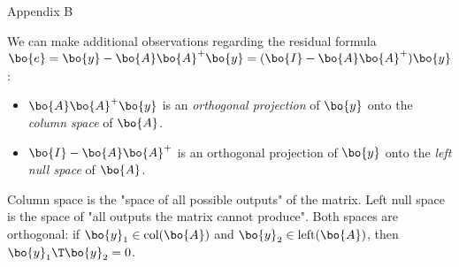 \documentclass{beamer}
\begin{document}
\begin{frame}{Appendix B}
	\begin{flushleft}
		
		We can make additional observations regarding the residual formula $\bo{e} = \bo{y} - \bo{A}\bo{A}^+\bo{y} = (\bo{I} - \bo{A}\bo{A}^+)\bo{y} $:
		
		\begin{itemize}
			
			\item $\bo{A}\bo{A}^+\bo{y}$ is an \emph{orthogonal projection} of $\bo{y}$ onto the \emph{column space} of $\bo{A}$.
			
			\item $\bo{I} - \bo{A}\bo{A}^+$ is an orthogonal projection of $\bo{y}$ onto the \emph{left null space} of $\bo{A}$.
		\end{itemize}
		
		Column space is the "space of all possible outputs" of the matrix. Left null space is the space of "all outputs the matrix cannot produce". Both spaces are orthogonal: if $\bo{y}_1 \in \text{col}(\bo{A})$ and $\bo{y}_2 \in \text{left}(\bo{A})$, then $\bo{y}_1\T \bo{y}_2  = 0$.
		
	\end{flushleft}
\end{frame}
\end{document}

